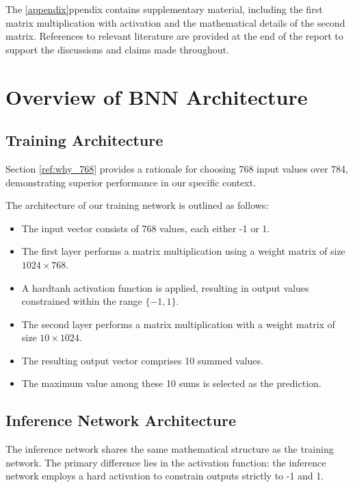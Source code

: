 \documentclass[conference]{IEEEtran}
\newcounter{todocount}
\newcommand{\todo}[1]{
  \stepcounter{todocount}
}
\begin{document}
The \ref{appendix}ppendix contains supplementary material, including the first matrix multiplication with activation and the mathematical details of the second matrix. References to relevant literature are provided at the end of the report to support the discussions and claims made throughout.


\todo{written table of contents for coming sections -> DONE}

\section{Overview of BNN Architecture}
\label{sec:overview}
\subsection{Training Architecture}
Section \autoref{ref:why_768} provides a rationale for choosing 768 input values over 784, demonstrating superior performance in our specific context.

The architecture of our training network is outlined as follows:
\begin{itemize}
    \item The input vector consists of 768 values, each either -1 or 1.
    \item The first layer performs a matrix multiplication using a weight matrix of size \(1024 \times 768\).
    \item A hardtanh activation function is applied, resulting in output values constrained within the range \(\{-1, 1\}\).
    \item The second layer performs a matrix multiplication with a weight matrix of size \(10 \times 1024\).
    \item The resulting output vector comprises 10 summed values.
    \item The maximum value among these 10 sums is selected as the prediction.
\end{itemize}

\subsection{Inference Network Architecture}
\label{subsec:inference_network_architecture}
The inference network shares the same mathematical structure as the training network. The primary difference lies in the activation function: the inference network employs a hard activation to constrain outputs strictly to -1 and 1.
\end{document}
